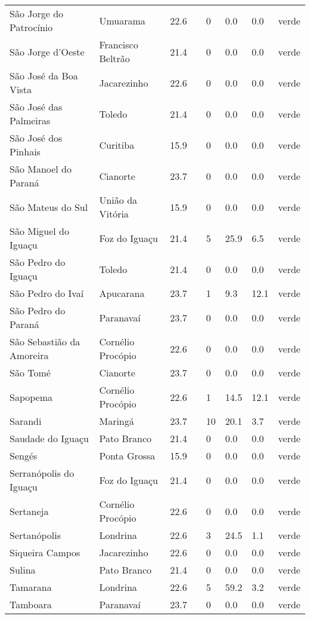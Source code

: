 \begin{longtable}{l|lllllll}
  São Jorge do Patrocínio & Umuarama & 22.6 &  & 0 & 0.0 & 0.0 & verde \\ 
  São Jorge d'Oeste & Francisco Beltrão & 21.4 &  & 0 & 0.0 & 0.0 & verde \\ 
  São José da Boa Vista & Jacarezinho & 22.6 &  & 0 & 0.0 & 0.0 & verde \\ 
  São José das Palmeiras & Toledo & 21.4 &  & 0 & 0.0 & 0.0 & verde \\ 
  São José dos Pinhais & Curitiba & 15.9 &  & 0 & 0.0 & 0.0 & verde \\ 
  São Manoel do Paraná & Cianorte & 23.7 &  & 0 & 0.0 & 0.0 & verde \\ 
  São Mateus do Sul & União da Vitória & 15.9 &  & 0 & 0.0 & 0.0 & verde \\ 
  São Miguel do Iguaçu & Foz do Iguaçu & 21.4 &  & 5 & 25.9 & 6.5 & verde \\ 
  São Pedro do Iguaçu & Toledo & 21.4 &  & 0 & 0.0 & 0.0 & verde \\ 
  São Pedro do Ivaí & Apucarana & 23.7 &  & 1 & 9.3 & 12.1 & verde \\ 
  São Pedro do Paraná & Paranavaí & 23.7 &  & 0 & 0.0 & 0.0 & verde \\ 
  São Sebastião da Amoreira & Cornélio Procópio & 22.6 &  & 0 & 0.0 & 0.0 & verde \\ 
  São Tomé & Cianorte & 23.7 &  & 0 & 0.0 & 0.0 & verde \\ 
  Sapopema & Cornélio Procópio & 22.6 &  & 1 & 14.5 & 12.1 & verde \\ 
  Sarandi & Maringá & 23.7 &  & 10 & 20.1 & 3.7 & verde \\ 
  Saudade do Iguaçu & Pato Branco & 21.4 &  & 0 & 0.0 & 0.0 & verde \\ 
  Sengés & Ponta Grossa & 15.9 &  & 0 & 0.0 & 0.0 & verde \\ 
  Serranópolis do Iguaçu & Foz do Iguaçu & 21.4 &  & 0 & 0.0 & 0.0 & verde \\ 
  Sertaneja & Cornélio Procópio & 22.6 &  & 0 & 0.0 & 0.0 & verde \\ 
  Sertanópolis & Londrina & 22.6 &  & 3 & 24.5 & 1.1 & verde \\ 
  Siqueira Campos & Jacarezinho & 22.6 &  & 0 & 0.0 & 0.0 & verde \\ 
  Sulina & Pato Branco & 21.4 &  & 0 & 0.0 & 0.0 & verde \\ 
  Tamarana & Londrina & 22.6 &  & 5 & 59.2 & 3.2 & verde \\ 
  Tamboara & Paranavaí & 23.7 &  & 0 & 0.0 & 0.0 & verde \\ 

\end{longtable}

